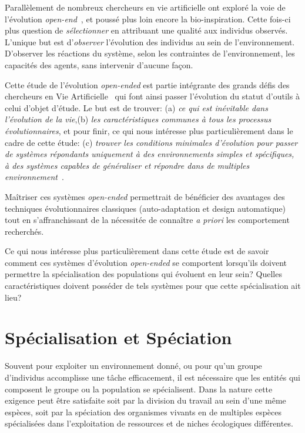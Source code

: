 \documentclass[a4paper,10pt]{report}
\begin{document}
Parallèlement de nombreux chercheurs en vie artificielle ont exploré la voie de l'évolution \emph{open-end}~\citep{ray91tierra,adami94avida}, et poussé plus loin encore la bio-inspiration. Cette fois-ci plus question de \emph{sélectionner} en attribuant une qualité aux individus observés. L'unique but est d'\emph{observer} l'évolution des individus au sein de l'environnement. D'observer les réactions du système, selon les contraintes de l'environnement, les capacités des agents, sans intervenir d'aucune fa\c con.

Cette étude de l'évolution \emph{open-ended} est partie intégrante des grands défis des chercheurs en Vie Artificielle~\citep{bedau00openprobartilife} qui font ainsi passer l'évolution du statut d'outils à celui d'objet d'étude.
Le but est de trouver: (a) \emph{ce qui est inévitable dans l'évolution de la vie},(b) \emph{les caractéristiques communes à tous les processus évolutionnaires}, et pour finir, ce qui nous intéresse plus particulièrement dans le cadre de cette étude: (c) \emph{trouver les conditions minimales d'évolution pour passer de systèmes répondants uniquement à des environnements simples et spécifiques, à des systèmes capables de généraliser et répondre dans de multiples environnement}~\citep[voir respectivement les chapitres 3.6, 3.10 et 3.7 ]{bedau00openprobartilife}.

Maîtriser ces systèmes \emph{open-ended} permettrait de bénéficier des avantages des techniques évolutionnaires classiques (auto-adaptation et design automatique) tout en s'affranchissant de la nécessitée de connaître \emph{a priori} les comportement recherchés.

Ce qui nous intéresse plus particulièrement dans cette étude est de savoir comment ces systèmes d'évolution \emph{open-ended} se comportent lorsqu'ils doivent permettre la spécialisation des populations qui évoluent en leur sein?
Quelles caractéristiques doivent posséder de tels systèmes pour que cette spécialisation ait lieu?





\section{Spécialisation et Spéciation}

Souvent pour exploiter un environnement donné, ou pour qu'un groupe d'individus accomplisse une tâche efficacement, il est nécessaire que les entités qui composent le groupe ou la population se spécialisent. Dans la nature cette exigence peut être satisfaite soit par la division du travail au sein d'une même espèces, soit par la spéciation des organismes vivants en de multiples espèces spécialisées dans l'exploitation de ressources et de niches écologiques différentes.
\label{sec:concept:ssl}
\end{document}
